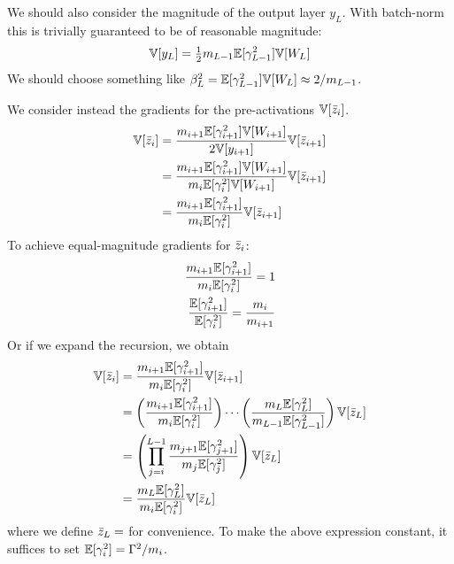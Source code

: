We should also consider the magnitude of the output layer $y_{L}$.
With batch-norm this is trivially guaranteed to be of reasonable magnitude:
\begin{align}
\mathbb{V}[y_{L}] = \tfrac{1}{2} m_{L-1} \mathbb{E}[\gamma_{L-1}^2] \mathbb{V}[W_{L}]
\end{align}
We should choose something like $\beta_{L}^2 = \mathbb{E}[\gamma_{L-1}^2] \mathbb{V}[W_{L}] \approx 2 / m_{L-1}$.

We consider instead the gradients for the pre-activations $\mathbb{V}[\bar{z}_{i}]$.
\begin{align}
\mathbb{V}[\bar{z}_{i}]
& = \frac{m_{i+1} \mathbb{E}[\gamma_{i+1}^2] \mathbb{V}[W_{i+1}]}{2 \mathbb{V}[y_{i+1}]} \mathbb{V}[\bar{z}_{i+1}] \\
& = \frac{m_{i+1} \mathbb{E}[\gamma_{i+1}^2] \mathbb{V}[W_{i+1}]}{m_{i} \mathbb{E}[\gamma_{i}^2] \mathbb{V}[W_{i+1}]} \mathbb{V}[\bar{z}_{i+1}] \\
& = \frac{m_{i+1} \mathbb{E}[\gamma_{i+1}^2]}{m_{i} \mathbb{E}[\gamma_{i}^2]} \mathbb{V}[\bar{z}_{i+1}]
\end{align}
To achieve equal-magnitude gradients for $\bar{z}_{i}$:
\begin{align}
\frac{m_{i+1} \mathbb{E}[\gamma_{i+1}^2]}{m_{i} \mathbb{E}[\gamma_{i}^2]} = 1 \\
\frac{\mathbb{E}[\gamma_{i+1}^2]}{\mathbb{E}[\gamma_{i}^2]} = \frac{m_{i}}{m_{i+1}}
\end{align}
Or if we expand the recursion, we obtain
\begin{align}
\mathbb{V}[\bar{z}_{i}]
& = \frac{m_{i+1} \mathbb{E}[\gamma_{i+1}^2]}{m_{i} \mathbb{E}[\gamma_{i}^2]} \mathbb{V}[\bar{z}_{i+1}] \\
& = \left( \frac{m_{i+1} \mathbb{E}[\gamma_{i+1}^2]}{m_{i} \mathbb{E}[\gamma_{i}^2]} \right) \cdots
  \left( \frac{m_{L} \mathbb{E}[\gamma_{L}^2]}{m_{L-1} \mathbb{E}[\gamma_{L-1}^2]} \right) \mathbb{V}[\bar{z}_{L}] \\
& = \left( \prod_{j = i}^{L-1} \frac{m_{j+1} \mathbb{E}[\gamma_{j+1}^2]}{m_{j} \mathbb{E}[\gamma_{j}^2]} \right) \mathbb{V}[\bar{z}_{L}] \\
& = \frac{m_{L} \mathbb{E}[\gamma_{L}^2]}{m_{i} \mathbb{E}[\gamma_{i}^2]} \mathbb{V}[\bar{z}_{L}]
\end{align}
where we define $\bar{z}_{L} = $ for convenience.
To make the above expression constant, it suffices to set $\mathbb{E}[\gamma_{i}^2] = \Gamma^2 / m_{i}$.

